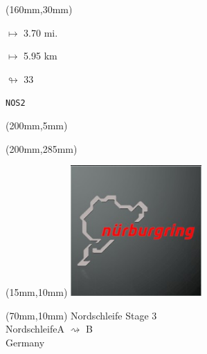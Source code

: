 \begin{textblock*}{40mm}(160mm,30mm)%
\Large
\par$\mapsto$ 3.70 mi.
\par$\mapsto$ 5.95 km
\par$\looparrowright$ 33
\par\hfill\tiny\tt NOS2\\
\end{textblock*}
\begin{textblock*}{20mm}(200mm,5mm)%
\fbox{\thepage}
\label{NOS2}
\end{textblock*}
\begin{textblock*}{20mm}(200mm,285mm)%
\fbox{\thepage}
\end{textblock*}

\null\newpage
\begin{textblock*}{50mm}(15mm,10mm)%
\includegraphics[width=50mm]{LG/2015-05-20_00088.png}
\end{textblock*}
\begin{textblock*}{130mm}(70mm,10mm)%
{\fontsize{20}{20}\selectfont Nordschleife Stage 3\\}
{\fontsize{16}{16}\selectfont Nordschleife\hfill A $\rightsquigarrow$ B\\}
{\fontsize{12}{12}\selectfont Germany\\}
\end{textblock*}
